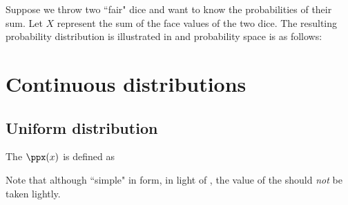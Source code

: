 \begin{example}
\label{ex:two_dice}
Suppose we throw two ``fair" dice and want to know the probabilities of their sum.
Let $X$ represent the sum  of the face values of the two dice.
The resulting probability distribution is illustrated in 
and probability space is as follows:


\end{example}

\section{Continuous distributions}
\subsection{Uniform distribution}
\begin{definition}
\label{def:uniform}
The  $\ppx(x)$ is defined as 
\end{definition}

Note that although ``simple" in form, in light of , the 
value of the  should \emph{not} be taken lightly.

